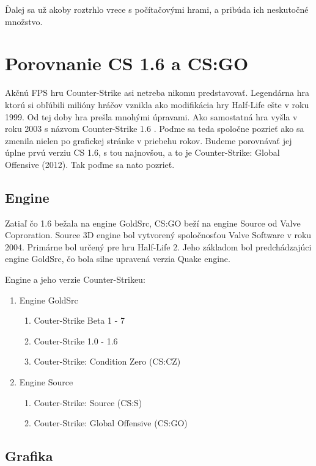 \documentclass[10pt,oneside,slovak,a4paper]{article}
\begin{document}
Ďalej sa už akoby roztrhlo vrece s počítačovými hrami, a pribúda ich neskutočné množstvo.

\section{Porovnanie CS 1.6 a CS:GO} \label{porovnanie}

Akčnú FPS hru Counter-Strike asi netreba nikomu predstavovať. Legendárna hra ktorú si obľúbili milióny hráčov vznikla ako modifikácia hry Half-Life ešte v roku 1999. Od tej doby hra prešla mnohými úpravami. Ako samostatná hra vyšla v roku 2003 s názvom Counter-Strike 1.6 . Poďme sa teda spoločne pozrieť ako sa zmenila nielen po grafickej stránke v priebehu rokov. Budeme porovnávať jej úplne prvú verziu CS 1.6, s tou najnovšou, a to je Counter-Strike: Global Offensive (2012). Tak poďme sa nato pozrieť.


\subsection{Engine} \label{porovnanie:engine}
Zatiaľ čo 1.6 bežala na engine GoldSrc, CS:GO beží na engine Source od Valve Coproration. Source 3D engine bol vytvorený spoločnosťou Valve Software v roku 2004. Primárne bol určený pre hru Half-Life 2. Jeho základom bol predchádzajúci engine GoldSrc, čo bola silne upravená verzia Quake engine.

\pagebreak

Engine a jeho verzie Counter-Strikeu:
\begin{enumerate}
\item Engine GoldSrc
	\begin{enumerate}
	\item Couter-Strike Beta 1 - 7
	\item Couter-Strike 1.0 - 1.6
	\item Couter-Strike: Condition Zero (CS:CZ)
	\end{enumerate}
\item Engine Source
	\begin{enumerate}
	\item Couter-Strike: Source (CS:S)
	\item Couter-Strike: Global Offensive (CS:GO)
	\end{enumerate}
\end{enumerate}



\subsection{Grafika} \label{porovnanie:grafika}
\end{document}

